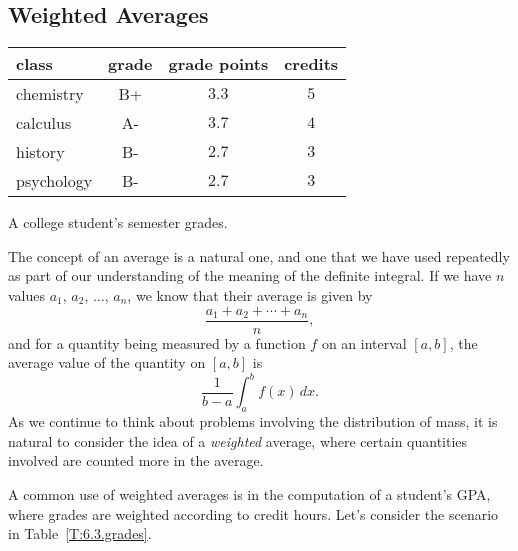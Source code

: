 


\subsection*{Weighted Averages}

\begin{margintable}
\begin{center}
\begin{tabular}{ | l || c | c | c |}
   \hline 
   class & grade & grade points & credits  \\
   \hline \hline
   chemistry & B+ & $3.3$ & $5$ \\
   \hline
   calculus & A- & $3.7$ & $4$ \\
   \hline
   history & B- & $2.7$ & $3$ \\
   \hline
   psychology & B- & $2.7$ & $3$ \\
   \hline
\end{tabular} 
\end{center}
\caption{A college student's semester grades.} \label{T:6.3.grades}
\end{margintable}

The concept of an average is a natural one, and one that we have used repeatedly as part of our understanding of the meaning of the definite integral.  If we have $n$ values $a_1$, $a_2$, $\ldots$, $a_n$, we know that their average is given by
$$\frac{a_1 + a_2 + \cdots + a_n}{n},$$
and for a quantity being measured by a function $f$ on an interval $[a,b]$, the average value of the quantity on $[a,b]$ is
$$\frac{1}{b-a} \int_a^b f(x) \, dx.$$
As we continue to think about problems involving the distribution of mass, it is natural to consider the idea of a \emph{weighted} average,  where certain quantities involved are counted more in the average.

A common use of weighted averages is in the computation of a student's GPA, where grades are weighted according to credit hours.  Let's consider the scenario in Table~\ref{T:6.3.grades}.

